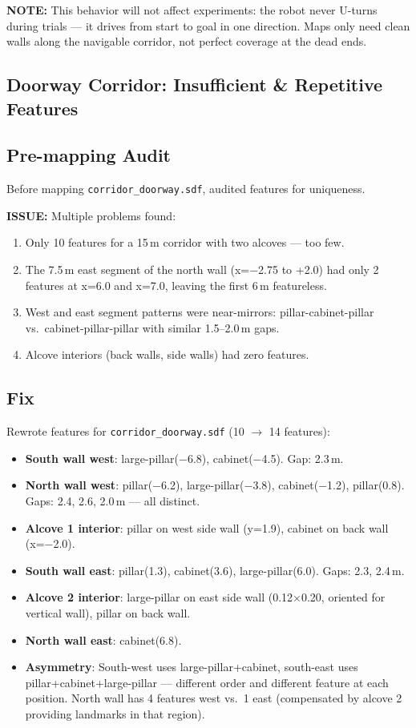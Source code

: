 \documentclass[11pt]{article}
\newcommand{\logentry}[1]{\subsection*{#1}}
\newcommand{\issue}[1]{\textcolor{issuered}{\textbf{ISSUE:} #1}}
\newcommand{\note}[1]{\textcolor{notblue}{\textbf{NOTE:} #1}}
\begin{document}
\note{This behavior will not affect experiments: the robot never U-turns during
trials --- it drives from start to goal in one direction. Maps only need clean
walls along the navigable corridor, not perfect coverage at the dead ends.}

\subsection*{Doorway Corridor: Insufficient \& Repetitive Features}

\logentry{Pre-mapping Audit}
Before mapping \texttt{corridor\_doorway.sdf}, audited features for uniqueness.

\issue{Multiple problems found:}
\begin{enumerate}
  \item Only 10 features for a 15\,m corridor with two alcoves --- too few.
  \item The 7.5\,m east segment of the north wall (x=$-$2.75 to +2.0) had
    only 2 features at x=6.0 and x=7.0, leaving the first 6\,m featureless.
  \item West and east segment patterns were near-mirrors: pillar-cabinet-pillar
    vs.\ cabinet-pillar-pillar with similar 1.5--2.0\,m gaps.
  \item Alcove interiors (back walls, side walls) had zero features.
\end{enumerate}

\logentry{Fix}
Rewrote features for \texttt{corridor\_doorway.sdf} (10 $\to$ 14 features):
\begin{itemize}
  \item \textbf{South wall west}: large-pillar($-$6.8), cabinet($-$4.5).
    Gap: 2.3\,m.
  \item \textbf{North wall west}: pillar($-$6.2), large-pillar($-$3.8),
    cabinet($-$1.2), pillar(0.8). Gaps: 2.4, 2.6, 2.0\,m --- all distinct.
  \item \textbf{Alcove 1 interior}: pillar on west side wall (y=1.9),
    cabinet on back wall (x=$-$2.0).
  \item \textbf{South wall east}: pillar(1.3), cabinet(3.6),
    large-pillar(6.0). Gaps: 2.3, 2.4\,m.
  \item \textbf{Alcove 2 interior}: large-pillar on east side wall
    (0.12$\times$0.20, oriented for vertical wall), pillar on back wall.
  \item \textbf{North wall east}: cabinet(6.8).
  \item \textbf{Asymmetry}: South-west uses large-pillar+cabinet, south-east
    uses pillar+cabinet+large-pillar --- different order and different feature
    at each position. North wall has 4 features west vs.\ 1 east (compensated
    by alcove 2 providing landmarks in that region).
\end{itemize}
\end{document}
